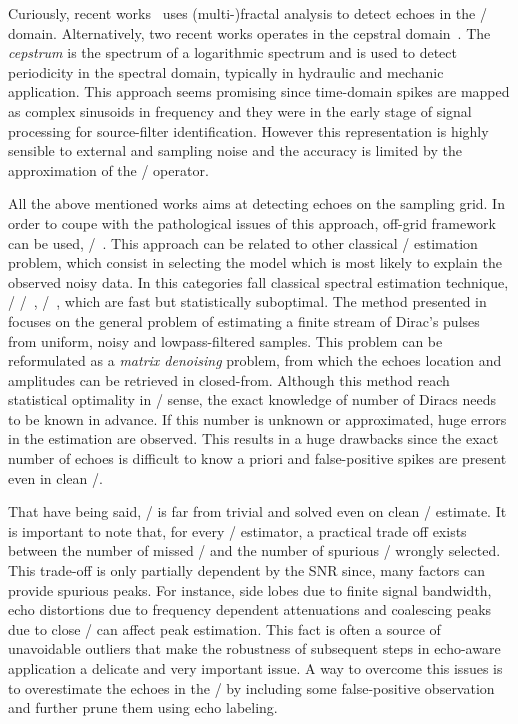 Curiously, recent works~ uses (multi-)fractal analysis to detect echoes in the \TF/ domain.
Alternatively, two recent works operates in the cepstral domain~.
The \textit{cepstrum} is the spectrum of a logarithmic spectrum and is used to detect periodicity in the spectral domain, typically in hydraulic and mechanic application.
This approach seems promising since time-domain spikes are mapped as complex sinusoids in frequency and they were in the early stage of signal processing for source-filter identification.
However this representation is highly sensible to external and sampling noise and the accuracy is limited by the approximation of the \DFT/ operator.

\mynewline
All the above mentioned works aims at detecting echoes on the sampling grid.
In order to coupe with the pathological issues of this approach, off-grid framework can be used, \eg/~.
This approach can be related to other classical \MLdef/ estimation problem, which consist in selecting the model which is most likely to explain the observed noisy data.
In this categories fall classical spectral estimation technique, \eg/ \MUSIC/~, \ESPRIT/~, which are fast but statistically suboptimal.
The method presented in  focuses on the general problem of estimating a finite stream of Dirac's pulses from uniform, noisy and lowpass-filtered samples.
This problem can be reformulated as a \textit{matrix denoising} problem, from which the echoes location and amplitudes can be retrieved in closed-from.
Although this method reach statistical optimality in \ML/ sense, the exact knowledge of number of Diracs needs to be known in advance.
If this number is unknown or approximated, huge errors in the estimation are observed.
This results in a huge drawbacks since the exact number of echoes is difficult to know a priori and false-positive spikes are present even in clean \RIRs/.

\mynewline
That have being said, \AER/ is far from trivial and solved even on clean \RIR/ estimate.
It is important to note that, for every \TOA/ estimator, a practical trade off exists between the number of missed \TOAs/ and the number of spurious \TOAs/ wrongly selected.
This trade-off is only partially dependent by the SNR since, many factors can provide spurious peaks.
For instance, side lobes due to finite signal bandwidth, echo distortions due to frequency dependent attenuations and coalescing peaks due to close \TOAs/ can affect peak estimation.
This fact is often a source of unavoidable outliers that make the robustness of subsequent steps in echo-aware application a delicate and very important issue.
A way to overcome this issues is to overestimate the echoes in the \RIR/ by including some false-positive observation and further prune them using echo labeling.


